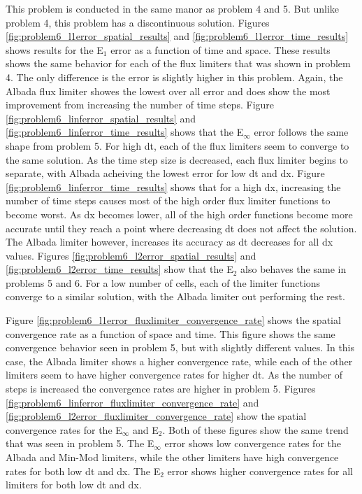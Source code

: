 This problem is conducted in the same manor as problem 4 and 5. But unlike problem 4, this problem has a discontinuous solution. Figures \ref{fig:problem6_l1error_spatial_results} and  \ref{fig:problem6_l1error_time_results} shows results for the E${}_{1}$ error as a function of time and space. These results shows the same behavior for each of the flux limiters that was shown in problem 4. The only difference is the error is slightly higher in this problem. Again, the Albada flux limiter showes the lowest over all error and does show the most improvement from increasing the number of time steps. Figure \ref{fig:problem6_linferror_spatial_results} and \ref{fig:problem6_linferror_time_results} shows that the E${}_{\infty}$ error follows the same shape from problem 5. For high dt, each of the flux limiters seem to converge to the same solution. As the time step size is decreased, each flux limiter begins to separate, with Albada acheiving the lowest error for low dt and dx. Figure \ref{fig:problem6_linferror_time_results} shows that for a high dx, increasing the number of time steps causes most of the high order flux limiter functions to become worst. As dx becomes lower, all of the high order functions become more accurate until they reach a point where decreasing dt does not affect the solution. The Albada limiter however, increases its accuracy as dt decreases for all dx values. Figures \ref{fig:problem6_l2error_spatial_results} and \ref{fig:problem6_l2error_time_results} show that the E${}_{2}$ also behaves the same in problems 5 and 6. For a low number of cells, each of the limiter functions converge to a similar solution, with the Albada limiter out performing the rest. 

Figure \ref{fig:problem6_l1error_fluxlimiter_convergence_rate} shows the spatial convergence rate as a function of space and time. This figure shows the same convergence behavior seen in problem 5, but with slightly different values. In this case, the Albada limiter shows a higher convergence rate, while each of the other limiters seem to have higher convergence rates for higher dt. As the number of steps is increased the convergence rates are higher in problem 5. Figures \ref{fig:problem6_linferror_fluxlimiter_convergence_rate} and \ref{fig:problem6_l2error_fluxlimiter_convergence_rate} show the spatial convergence rates for the E${}_{\infty}$ and E${}_{2}$. Both of these figures show the same trend that was seen in problem 5. The E${}_{\infty}$ error shows low convergence rates for the Albada and Min-Mod limiters, while the other limiters have high convergence rates for both low dt and dx. The E${}_{2}$ error shows higher convergence rates for all limiters for both low dt and dx. 

